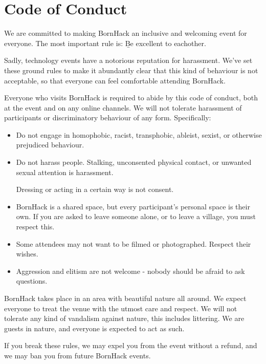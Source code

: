 \chapter{Code of Conduct}

We are committed to making BornHack an inclusive and welcoming event for
everyone. The most important rule is: \b{Be excellent to eachother}.

Sadly, technology events have a notorious reputation for harassment. We've set
these ground rules to make it abundantly clear that this kind of behaviour is
not acceptable, so that everyone can feel comfortable attending BornHack.

Everyone who visits BornHack is required to abide by this code of conduct, both
at the event and on any online channels. We will not tolerate harassment of
participants or discriminatory behaviour of any form. Specifically:

\begin{itemize}
    \item
    Do not engage in homophobic, racist, transphobic, ableist, sexist, or
    otherwise prejudiced behaviour.

    \item
    Do not harass people. Stalking, unconsented physical contact, or unwanted
    sexual attention is harassment.

    Dressing or acting in a certain way is not consent.

    \item
    BornHack is a shared space, but every participant's personal space is their
    own. If you are asked to leave someone alone, or to leave a village, you
    must respect this.

    \item
    Some attendees may not want to be filmed or photographed. Respect their
    wishes.

    \item
    Aggression and elitism are not welcome - nobody should be afraid to ask
    questions.
\end{itemize}

BornHack takes place in an area with beautiful nature all around. We expect
everyone to treat the venue with the utmost care and respect. We will not
tolerate any kind of vandalism against nature, this includes littering. We are
guests in nature, and everyone is expected to act as such.

If you break these rules, we may expel you from the event without a refund, and
we may ban you from future BornHack events.

